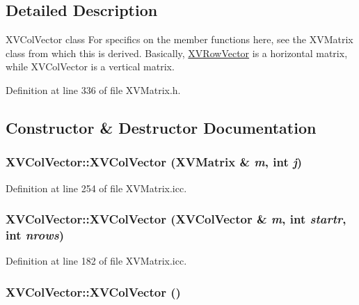 \subsection{Detailed Description}
XVCol\-Vector class For specifics on the member functions here, see the XVMatrix class from which this is derived. Basically, \hyperlink{class_XVRowVector}{XVRow\-Vector} is a horizontal matrix, while XVCol\-Vector is a vertical matrix.





Definition at line 336 of file XVMatrix.h.

\subsection{Constructor \& Destructor Documentation}
\label{XVColVector_b0}
\hypertarget{class_XVColVector_b0}{
\subsubsection[XVColVector]{\setlength{\rightskip}{0pt plus 5cm}XVCol\-Vector::XVCol\-Vector (XVMatrix \& {\em m}, int {\em j})}}




Definition at line 254 of file XVMatrix.icc.\label{XVColVector_b1}
\hypertarget{class_XVColVector_b1}{
\subsubsection[XVColVector]{\setlength{\rightskip}{0pt plus 5cm}XVCol\-Vector::XVCol\-Vector (XVCol\-Vector \& {\em m}, int {\em startr}, int {\em nrows})}}




Definition at line 182 of file XVMatrix.icc.\label{XVColVector_a0}
\hypertarget{class_XVColVector_a0}{
\subsubsection[XVColVector]{\setlength{\rightskip}{0pt plus 5cm}XVCol\-Vector::XVCol\-Vector ()}}




